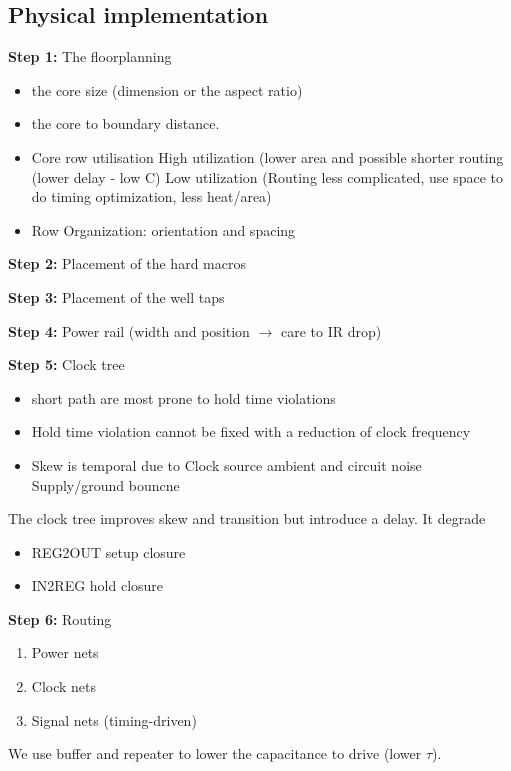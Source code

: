 

\subsection{Physical implementation}
\textbf{Step 1:} The floorplanning
\begin{itemize}
  \item the core size (dimension or the aspect ratio)
  \item the core to boundary distance.
  \item Core row utilisation
    \subitem High utilization (lower area and possible shorter routing (lower delay - low C)
    \subitem Low utilization (Routing less complicated, use space to do timing optimization, less heat/area)
  \item Row Organization: orientation and spacing
\end{itemize}

\textbf{Step 2:} Placement of the hard macros

\textbf{Step 3:} Placement of the well taps

\textbf{Step 4:} Power rail (width and position \(\rightarrow\) care to IR drop)

\textbf{Step 5:} Clock tree
\begin{itemize}
  \item short path are most prone to hold time violations
  \item Hold time violation cannot be fixed with a reduction of clock frequency
  \item Skew is temporal due to
    \subitem Clock source
    \subitem ambient and circuit noise
    \subitem Supply/ground bouncne
\end{itemize}
The clock tree improves skew and transition but introduce a delay. It degrade
\begin{itemize}
  \item REG2OUT setup closure
  \item IN2REG hold closure
\end{itemize}

\textbf{Step 6:} Routing
\begin{enumerate}
  \item Power nets
  \item Clock nets
  \item Signal nets (timing-driven)
\end{enumerate}
We use buffer and repeater to lower the capacitance to drive (lower \(\tau\)).

